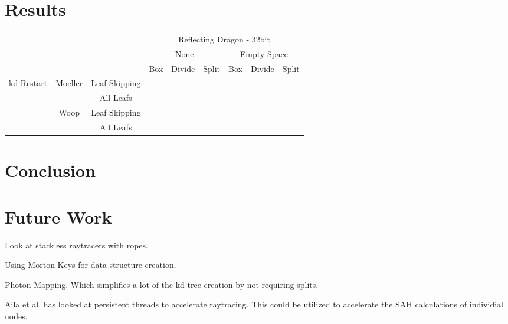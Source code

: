\chapter{Results}





\begin{tabular}{ r  c  c | c | c | c | c | c | c |}
  &&& \multicolumn{6}{|c|}{Reflecting Dragon - 32bit} \\
  \cline{4-9}
  &&& \multicolumn{3}{|c|}{None} & \multicolumn{3}{|c|}{Empty Space} \\
  \cline{4-9}
  &&& Box & Divide & Split & Box & Divide & Split \\
  \hline
  \multirow{4}{*}{kd-Restart} & \multirow{2}{*}{Moeller} & Leaf Skipping & \\
  && All Leafs & \\
  \cline{2-8}
  & \multirow{2}{*}{Woop} & Leaf Skipping & \\
  && All Leafs & \\
  \hline
\end{tabular}

\chapter{Conclusion}


\chapter{Future Work}


Look at stackless raytracers with ropes.

Using Morton Keys for data structure creation.

Photon Mapping. Which simplifies a lot of the kd tree creation by not
requiring splits.

Aila et al. has looked at persistent threads to
accelerate raytracing. This could be utilized to accelerate the SAH
calculations of individial nodes.

